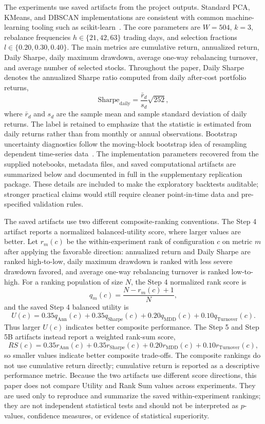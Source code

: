 \documentclass[runningheads]{llncs}
\begin{document}
The experiments use saved artifacts from the project outputs. Standard PCA, KMeans, and DBSCAN implementations are consistent with common machine-learning tooling such as scikit-learn~\cite{pedregosa2011}. The core parameters are $W=504$, $k=3$, rebalance frequencies $h\in\{21,42,63\}$ trading days, and selection fractions $l\in\{0.20,0.30,0.40\}$. The main metrics are cumulative return, annualized return, Daily Sharpe, daily maximum drawdown, average one-way rebalancing turnover, and average number of selected stocks. Throughout the paper, Daily Sharpe denotes the annualized Sharpe ratio computed from daily after-cost portfolio returns,
\[
\mathrm{Sharpe}_{\mathrm{daily}}=\frac{\bar r_d}{s_d}\sqrt{252},
\]
where $\bar r_d$ and $s_d$ are the sample mean and sample standard deviation of daily returns. The label is retained to emphasize that the statistic is estimated from daily returns rather than from monthly or annual observations. Bootstrap uncertainty diagnostics follow the moving-block bootstrap idea of resampling dependent time-series data~\cite{kunsch1989}. The implementation parameters recovered from the supplied notebooks, metadata files, and saved computational artifacts are summarized below and documented in full in the supplementary replication package. These details are included to make the exploratory backtests auditable; stronger practical claims would still require cleaner point-in-time data and pre-specified validation rules.

The saved artifacts use two different composite-ranking conventions. The Step 4 artifact reports a normalized balanced-utility score, where larger values are better. Let $r_m(c)$ be the within-experiment rank of configuration $c$ on metric $m$ after applying the favorable direction: annualized return and Daily Sharpe are ranked high-to-low, daily maximum drawdown is ranked with less severe drawdown favored, and average one-way rebalancing turnover is ranked low-to-high. For a ranking population of size $N$, the Step 4 normalized rank score is
\[
q_m(c)=\frac{N-r_m(c)+1}{N},
\]
and the saved Step 4 balanced utility is
\[
U(c)=0.35q_{\mathrm{Ann}}(c)+0.35q_{\mathrm{Sharpe}}(c)+0.20q_{\mathrm{MDD}}(c)+0.10q_{\mathrm{Turnover}}(c).
\]
Thus larger $U(c)$ indicates better composite performance. The Step 5 and Step 5B artifacts instead report a weighted rank-sum score,
\[
RS(c)=0.35r_{\mathrm{Ann}}(c)+0.35r_{\mathrm{Sharpe}}(c)+0.20r_{\mathrm{MDD}}(c)+0.10r_{\mathrm{Turnover}}(c),
\]
so smaller values indicate better composite trade-offs. The composite rankings do not use cumulative return directly; cumulative return is reported as a descriptive performance metric. Because the two artifacts use different score directions, this paper does not compare Utility and Rank Sum values across experiments. They are used only to reproduce and summarize the saved within-experiment rankings; they are not independent statistical tests and should not be interpreted as $p$-values, confidence measures, or evidence of statistical superiority.
\end{document}
